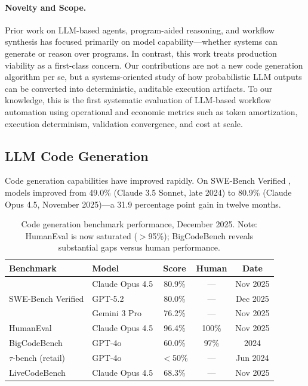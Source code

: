 \documentclass[11pt]{article}
\begin{document}
\paragraph{Novelty and Scope.}
Prior work on LLM-based agents, program-aided reasoning, and workflow synthesis has focused primarily on model capability---whether systems can generate or reason over programs. In contrast, this work treats production viability as a first-class concern. Our contributions are not a new code generation algorithm per se, but a systems-oriented study of how probabilistic LLM outputs can be converted into deterministic, auditable execution artifacts. To our knowledge, this is the first systematic evaluation of LLM-based workflow automation using operational and economic metrics such as token amortization, execution determinism, validation convergence, and cost at scale.

\subsection{LLM Code Generation}

Code generation capabilities have improved rapidly. On SWE-Bench Verified \citep{jimenez2024swebench}, models improved from 49.0\% (Claude 3.5 Sonnet, late 2024) to 80.9\% (Claude Opus 4.5, November 2025)---a 31.9 percentage point gain in twelve months.

\begin{table}[ht]
\centering
\caption{Code generation benchmark performance, December 2025. Note: HumanEval is now saturated ($>$95\%); BigCodeBench reveals substantial gaps versus human performance.}
\label{tab:benchmarks}
\begin{tabular}{llccc}
\toprule
Benchmark & Model & Score & Human & Date \\
\midrule
\multirow{3}{*}{SWE-Bench Verified} & Claude Opus 4.5 & 80.9\% & --- & Nov 2025 \\
 & GPT-5.2 & 80.0\% & --- & Dec 2025 \\
 & Gemini 3 Pro & 76.2\% & --- & Nov 2025 \\
\midrule
HumanEval & Claude Opus 4.5 & 96.4\% & 100\% & Nov 2025 \\
\midrule
BigCodeBench \citep{zhuo2024bigcodebench} & GPT-4o & 60.0\% & 97\% & 2024 \\
\midrule
$\tau$-bench (retail) \citep{yao2024taubench} & GPT-4o & $<$50\% & --- & Jun 2024 \\
\midrule
LiveCodeBench & Claude Opus 4.5 & 68.3\% & --- & Nov 2025 \\
\bottomrule
\end{tabular}
\end{table}
\end{document}
